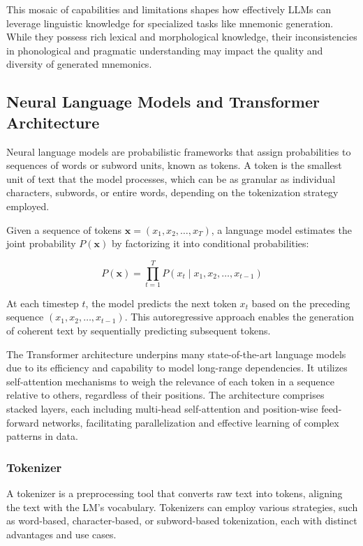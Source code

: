 \documentclass{article}
\newcounter{para}
\begin{document}
This mosaic of capabilities and limitations shapes how effectively LLMs can leverage linguistic knowledge for specialized tasks like mnemonic generation. While they possess rich lexical and morphological knowledge, their inconsistencies in phonological and pragmatic understanding may impact the quality and diversity of generated mnemonics.

\subsection{Neural Language Models and Transformer Architecture} \label{sec:pre-lm}

Neural language models are probabilistic frameworks that assign probabilities to sequences of words or subword units, known as tokens. A token is the smallest unit of text that the model processes, which can be as granular as individual characters, subwords, or entire words, depending on the tokenization strategy employed.

Given a sequence of tokens \( \mathbf{x} = (x_1, x_2, \ldots, x_T) \), a language model estimates the joint probability \( P(\mathbf{x}) \) by factorizing it into conditional probabilities:

\[
P(\mathbf{x}) = \prod_{t=1}^T P(x_t \mid x_1, x_2, \ldots, x_{t-1})
\]

At each timestep \( t \), the model predicts the next token \( x_t \) based on the preceding sequence \( (x_1, x_2, \ldots, x_{t-1}) \). This autoregressive approach enables the generation of coherent text by sequentially predicting subsequent tokens.

The Transformer architecture \citep{vaswani2017attention} underpins many state-of-the-art language models due to its efficiency and capability to model long-range dependencies. It utilizes self-attention mechanisms to weigh the relevance of each token in a sequence relative to others, regardless of their positions. The architecture comprises stacked layers, each including multi-head self-attention and position-wise feed-forward networks, facilitating parallelization and effective learning of complex patterns in data.

\subsubsection{Tokenizer} \label{sec:pre-tokenizer}

A tokenizer is a preprocessing tool that converts raw text into tokens, aligning the text with the LM's vocabulary. Tokenizers can employ various strategies, such as word-based, character-based, or subword-based tokenization, each with distinct advantages and use cases.
\end{document}
